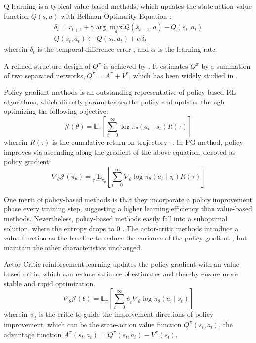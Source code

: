 \documentclass[nohyperref]{article}
\theoremstyle{plain}
\begin{document}
Q-learning is a typical value-based methods, which updates the state-action value function $Q(s,a)$ with Bellman Optimality Equation \citep{qlearning}: 
\begin{equation*}
    \begin{array}{c}
    \delta_{t}=r_{t+1}+\gamma \arg \max _{a} Q\left(s_{t+1}, a\right)-Q\left(s_{t}, a_{t}\right) \\
    Q\left(s_{t}, a_{t}\right) \leftarrow Q\left(s_{t}, a_{t}\right)+\alpha \delta_{t}
    \end{array}
\end{equation*}
wherein $\delta_t$ is the temporal difference error \citep{TDerror}, and $\alpha$ is the learning rate.

A refined structure design of $Q^\pi$ is achieved by \citep{dueling_q}. It estimates $Q^\pi$ by a summation of two separated networks, $Q^\pi = A^\pi + V^\pi$, which has been widely studied in \citep{dueling_q,casa_bridge}.


Policy gradient \citep[PG]{williams1992simple} methods is an outstanding representative of policy-based RL algorithms, which directly parameterizes the policy and  updates through optimizing the following objective: 
\begin{equation*}
    \mathcal{J} (\theta)=\mathbb{E}_{\pi}\left[\sum_{t=0}^{\infty} \log \pi_{\theta}\left(a_{t} \mid s_{t}\right) R(\tau)\right]
\end{equation*}
wherein $R(\tau)$ is the cumulative return on trajectory $\tau$. In PG method, policy improves via ascending  along the gradient of the above equation, denoted as policy gradient:
\begin{equation*}
\nabla_{\theta} \mathcal{J} \left(\pi_{\theta}\right) =\underset{\tau \sim \pi_{\theta}}{\mathrm{E}}\left[\sum_{t=0}^{\infty} \nabla_{\theta} \log \pi_{\theta}\left(a_{t} \mid s_{t}\right) R(\tau)\right]
\end{equation*}

One merit of policy-based methods is that they incorporate a policy improvement phase every training step, suggesting a higher learning efficiency than value-based methods.
Nevertheless, policy-based methods easily fall into a suboptimal solution, where the entropy drops to $0$ \citep{sac}.
The actor-critic methods introduce a value function as the baseline to reduce the variance of the policy gradient \citep{a3c}, but maintain the other characteristics unchanged.

Actor-Critic \citep[AC]{sutton} reinforcement learning updates the policy gradient with an value-based critic, which can reduce variance of estimates and thereby ensure  more stable and rapid optimization.
\begin{equation*}
    \nabla_{\theta} \mathcal{J}(\theta)=\mathbb{E}_{\pi}\left[\sum_{t=0}^{\infty} \psi_{t} \nabla_{\theta} \log \pi_{\theta}\left(a_{t} \mid s_{t}\right)\right]
\end{equation*}
wherein $\psi_{t}$ is the critic to guide the improvement directions of policy improvement, which can be the state-action value function $Q^{\pi}\left(s_{t}, a_{t}\right)$, the advantage function $A^{\pi}\left(s_{t}, a_{t}\right)=Q^{\pi}\left(s_{t}, a_{t}\right)-V^{\pi}(s_t)$.
\end{document}
